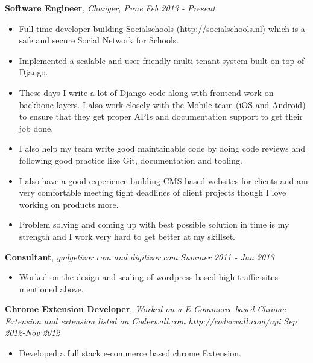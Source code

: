 \documentclass[9pt]{article}
\newenvironment{changemargin}[2]{%
  \begin{list}{}{%
    \setlength{\topsep}{0pt}%
    \setlength{\leftmargin}{#1}%
    \setlength{\rightmargin}{#2}%
    \setlength{\listparindent}{\parindent}%
    \setlength{\itemindent}{\parindent}%
    \setlength{\parsep}{\parskip}%
  }%
  \item[]}{\end{list}
}
\newenvironment{body} {
	\vspace*{-16pt}
	\begin{changemargin}{-0.25in}{-0.5in}
  }	
	{\end{changemargin}
}
\begin{document}
\begin{body}
	\vspace{14pt}
	\textbf{Software Engineer}, \emph{Changer, Pune} \hfill \emph{Feb 2013 - Present}\\
	\vspace*{-4pt}

\begin{itemize} 
	
	\item Full time developer building Socialschools (http://socialschools.nl) which is a safe and secure Social Network for Schools. 

	\item Implemented a scalable and user friendly multi tenant system built on top of Django.

	\item These days I write a lot of Django code along with frontend work on backbone layers. I also work closely with the Mobile team (iOS and Android) to ensure that they get proper APIs and documentation support to get their job done. 

	\item I also help my team write good maintainable code by doing code reviews and following good practice like Git, documentation and tooling.

	\item I also have a good experience building CMS based websites for clients and am very comfortable meeting tight deadlines of client projects though I love working on products more.

	\item Problem solving and coming up with best possible solution in time is my strength and I work very hard to get better at my skillset.
\end{itemize}
	\vspace{14pt}
	\textbf{Consultant}, \emph{gadgetizor.com and digitizor.com} \hfill \emph{Summer 2011 - Jan 2013}\\
	\vspace*{-4pt}
	\begin{itemize} \itemsep -0pt  %
		\item Worked on the design and scaling of wordpress based high traffic sites mentioned above.
	\end{itemize}

	\textbf {Chrome Extension Developer}, \emph{Worked on a E-Commerce based Chrome Extension and extension listed on Coderwall.com http://coderwall.com/api} \hfill \emph{Sep 2012-Nov 2012}\\
	\vspace*{-4pt}
	\begin{itemize} \itemsep -0pt
		\item Developed a full stack e-commerce based chrome Extension.
	\end{itemize}
\end{body}
\end{document}
